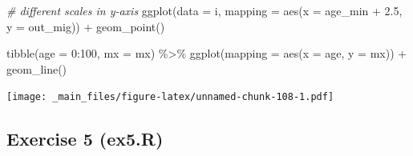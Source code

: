 \documentclass[
]{book}
\newenvironment{Shaded}{\begin{snugshade}}{\end{snugshade}}
\newcommand{\AttributeTok}[1]{\textcolor[rgb]{0.77,0.63,0.00}{#1}}
\newcommand{\CommentTok}[1]{\textcolor[rgb]{0.56,0.35,0.01}{\textit{#1}}}
\newcommand{\DecValTok}[1]{\textcolor[rgb]{0.00,0.00,0.81}{#1}}
\newcommand{\FloatTok}[1]{\textcolor[rgb]{0.00,0.00,0.81}{#1}}
\newcommand{\FunctionTok}[1]{\textcolor[rgb]{0.00,0.00,0.00}{#1}}
\newcommand{\NormalTok}[1]{#1}
\newcommand{\SpecialCharTok}[1]{\textcolor[rgb]{0.00,0.00,0.00}{#1}}
\begin{document}
\begin{Shaded}
\begin{Highlighting}[]
\CommentTok{\# different scales in y{-}axis}
\FunctionTok{ggplot}\NormalTok{(}\AttributeTok{data =}\NormalTok{ i, }
       \AttributeTok{mapping =} \FunctionTok{aes}\NormalTok{(}\AttributeTok{x =}\NormalTok{ age\_min }\SpecialCharTok{+} \FloatTok{2.5}\NormalTok{, }\AttributeTok{y =}\NormalTok{ out\_mig)) }\SpecialCharTok{+}
  \FunctionTok{geom\_point}\NormalTok{()}

\FunctionTok{tibble}\NormalTok{(}\AttributeTok{age =} \DecValTok{0}\SpecialCharTok{:}\DecValTok{100}\NormalTok{, }\AttributeTok{mx =}\NormalTok{ mx) }\SpecialCharTok{\%\textgreater{}\%}
  \FunctionTok{ggplot}\NormalTok{(}\AttributeTok{mapping =} \FunctionTok{aes}\NormalTok{(}\AttributeTok{x =}\NormalTok{ age, }\AttributeTok{y =}\NormalTok{ mx)) }\SpecialCharTok{+}
  \FunctionTok{geom\_line}\NormalTok{()}
\end{Highlighting}
\end{Shaded}

\texttt{[image: \_main\_files/figure-latex/unnamed-chunk-108-1.pdf]}

\hypertarget{exercise-5-ex5.r}{%
\subsection{Exercise 5 (ex5.R)}\label{exercise-5-ex5.r}}
\end{document}
